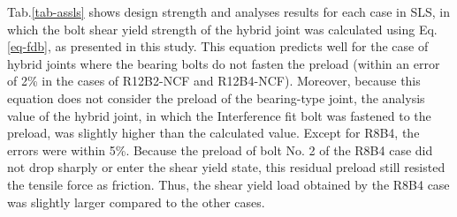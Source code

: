 Tab.\ref{tab-assls} shows design strength and analyses results for each case in SLS, in which the bolt shear yield strength of the hybrid joint was calculated using Eq.\ref{eq-fdb}, as presented in this study. This equation predicts well for the case of hybrid joints where the bearing bolts do not fasten the preload (within an error of 2\% in the cases of R12B2-NCF and R12B4-NCF). Moreover, because this equation does not consider the preload of the bearing-type joint, the analysis value of the hybrid joint, in which the Interference fit bolt was fastened to the preload, was slightly higher than the calculated value. Except for R8B4, the errors were within 5\%. Because the preload of bolt No. 2 of the R8B4 case did not drop sharply or enter the shear yield state, this residual preload still resisted the tensile force as friction. Thus, the shear yield load obtained by the R8B4 case was slightly larger compared to the other cases.

